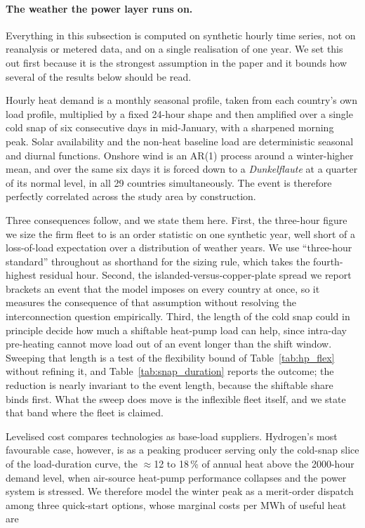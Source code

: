 \paragraph{The weather the power layer runs on.} Everything in this subsection is
computed on synthetic hourly time series, not on reanalysis or metered data, and on a single realisation of one year. We set this out first
because it is the strongest assumption in the paper and it bounds how several of the
results below should be read.

Hourly heat demand is a monthly seasonal profile, taken from each country's own load
profile, multiplied by a fixed 24-hour shape and then amplified over a single cold
snap of six consecutive days in mid-January, with a sharpened morning peak. Solar
availability and the non-heat baseline load are deterministic seasonal and diurnal
functions. Onshore wind is an AR(1) process around a winter-higher mean, and over the
same six days it is forced down to a \emph{Dunkelflaute} at a quarter of its normal
level, in all 29 countries simultaneously. The event is therefore perfectly correlated
across the study area by construction.

Three consequences follow, and we state them here.
First, the three-hour figure we size the firm fleet to is an order statistic on one synthetic year, well short of a loss-of-load expectation over a distribution of weather years.
We use ``three-hour standard'' throughout as shorthand for the sizing rule, which takes the fourth-highest residual hour.
Second, the islanded-versus-copper-plate spread we report brackets an event that the
model imposes on every country at once, so it measures the consequence of that assumption without resolving the interconnection question empirically. Third, the length of the cold snap could in principle decide how much a shiftable
heat-pump load can help, since intra-day pre-heating cannot move load out of an event
longer than the shift window. Sweeping that length
is a test of the flexibility bound of Table~\ref{tab:hp_flex} without refining it, and Table~\ref{tab:snap_duration} reports the outcome; the reduction is nearly
invariant to the event length, because the shiftable share binds first. What the sweep
does move is the inflexible fleet itself, and we state that band where the fleet is
claimed.

Levelised cost compares technologies as base-load suppliers. Hydrogen's most
favourable case, however, is as a peaking producer serving only the cold-snap slice
of the load-duration curve, the $\approx$12 to 18\,\% of annual heat above the
2000-hour demand level, when air-source heat-pump performance collapses and the
power system is stressed. We therefore model the winter peak as a merit-order
dispatch among three quick-start options, whose marginal costs per MWh of useful
heat are

